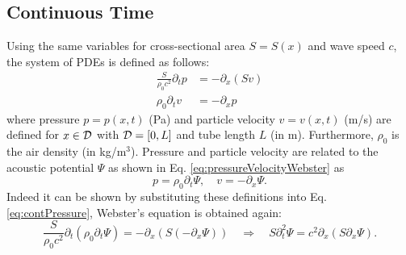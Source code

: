 {\subsection{Continuous Time}
Using the same variables for cross-sectional area $S=S(x)$ and wave speed $c$, the system of PDEs is defined as follows:
\begin{subequations}\label{eq:firstOrderSystem}
\begin{align}
    \frac{S}{\rho_0 c^2}\partial_t p &= -\partial_x(Sv)\label{eq:contPressure}\\
    \rho_0\partial_tv &= -\partial_xp\label{eq:discVelocity}
\end{align}
\end{subequations}
where pressure $p = p(x,t)$ (Pa) and particle velocity $v = v(x,t)$ (m/s) are defined for $x\in \mathcal{D}$ with $\mathcal{D} = [0, L]$ and tube length $L$ (in m). Furthermore, $\rho_0$ is the air density (in kg/m$^3$). Pressure and particle velocity are related to the acoustic potential $\Psi$ as shown in Eq. \eqref{eq:pressureVelocityWebster} as
\begin{equation*}
    p = \rho_0\partial_t \Psi, \quad v = -\partial_x\Psi.
\end{equation*}  
Indeed it can be shown by substituting these definitions into Eq. \eqref{eq:contPressure}, Webster's equation is obtained again:
\begin{equation}
  \nonumber
        \frac{S}{\rho_0 c^2}\partial_t(\rho_0 \partial_t\Psi) = -\partial_x(S(-\partial_x\Psi))\quad \Longrightarrow \quad S\partial_t^2\Psi = c^2\partial_x(S\partial_x\Psi).
\end{equation}

}

